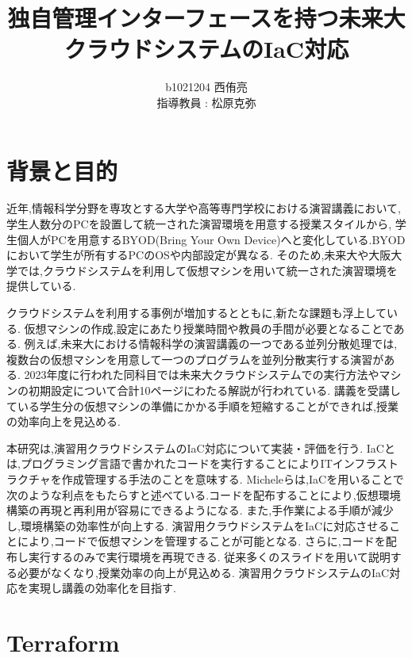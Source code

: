 \documentclass[11pt]{ujarticle}\sloppy
\author{%
b1021204 西侑亮\\指導教員 : 松原克弥
}
\title{独自管理インターフェースを持つ未来大クラウドシステムのIaC対応}
\begin{document}
\maketitle


\section{背景と目的}
\label{sec:intro}
近年,情報科学分野を専攻とする大学や高等専門学校における演習講義において,学生人数分のPCを設置して統一された演習環境を用意する授業スタイルから,
学生個人がPCを用意するBYOD(Bring Your Own Device)へと変化している\cite{byod}.BYODにおいて学生が所有するPCのOSや内部設定が異なる.
そのため,未来大や大阪大学では,クラウドシステムを利用して仮想マシンを用いて統一された演習環境を提供している\cite{oosakadai}.


クラウドシステムを利用する事例が増加するとともに,新たな課題も浮上している.
仮想マシンの作成,設定にあたり授業時間や教員の手間が必要となることである.
例えば,未来大における情報科学の演習講義の一つである並列分散処理では,複数台の仮想マシンを用意して一つのプログラムを並列分散実行する演習がある.
2023年度に行われた同科目では未来大クラウドシステムでの実行方法やマシンの初期設定について合計10ページにわたる解説が行われている.
講義を受講している学生分の仮想マシンの準備にかかる手順を短縮することができれば,授業の効率向上を見込める.


本研究は,演習用クラウドシステムのIaC対応について実装・評価を行う.
IaCとは,プログラミング言語で書かれたコードを実行することによりITインフラストラクチャを作成管理する手法のことを意味する\cite{O'Reilly Media}.
Micheleら\cite{InformationSystem}は,IaCを用いることで次のような利点をもたらすと述べている.コードを配布することにより,仮想環境構築の再現と再利用が容易にできるようになる.
また,手作業による手順が減少し,環境構築の効率性が向上する.
演習用クラウドシステムをIaCに対応させることにより,コードで仮想マシンを管理することが可能となる.
さらに,コードを配布し実行するのみで実行環境を再現できる.
従来多くのスライドを用いて説明する必要がなくなり,授業効率の向上が見込める.
演習用クラウドシステムのIaC対応を実現し講義の効率化を目指す.


\section{Terraform}
\end{document}
